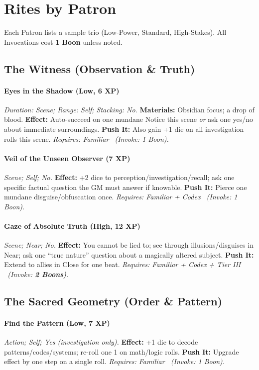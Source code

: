 \documentclass[12pt,twoside]{book}
\begin{document}
\section{Rites by Patron}
Each Patron lists a sample trio (Low-Power, Standard, High-Stakes). All Invocations cost \textbf{1 Boon} unless noted.

\subsection{The Witness (Observation \& Truth)}
\paragraph{Eyes in the Shadow (Low, 6 XP)} \emph{Duration: Scene; Range: Self; Stacking: No.}
\textbf{Materials:} Obsidian focus; a drop of blood.
\textbf{Effect:} Auto-succeed on one mundane Notice this scene \emph{or} ask one yes/no about immediate surroundings.
\textbf{Push It:} Also gain +1 die on all investigation rolls this scene.
\emph{Requires: Familiar \ (\textit{Invoke:} 1 Boon).}
\paragraph{Veil of the Unseen Observer (7 XP)} \emph{Scene; Self; No.}
\textbf{Effect:} +2 dice to perception/investigation/recall; ask one specific factual question the GM must answer if knowable.
\textbf{Push It:} Pierce one mundane disguise/obfuscation once.
\emph{Requires: Familiar + Codex \ (\textit{Invoke:} 1 Boon).}
\paragraph{Gaze of Absolute Truth (High, 12 XP)} \emph{Scene; Near; No.}
\textbf{Effect:} You cannot be lied to; see through illusions/disguises in Near; ask one ``true nature'' question about a magically altered subject.
\textbf{Push It:} Extend to allies in Close for one beat.
\emph{Requires: Familiar + Codex + Tier III \ (\textit{Invoke:} \textbf{2 Boons}).}

\subsection{The Sacred Geometry (Order \& Pattern)}
\paragraph{Find the Pattern (Low, 7 XP)} \emph{Action; Self; Yes (investigation only).}
\textbf{Effect:} +1 die to decode patterns/codes/systems; re-roll one 1 on math/logic rolls.
\textbf{Push It:} Upgrade effect by one step on a single roll.
\emph{Requires: Familiar \ (\textit{Invoke:} 1 Boon).}
\end{document}
